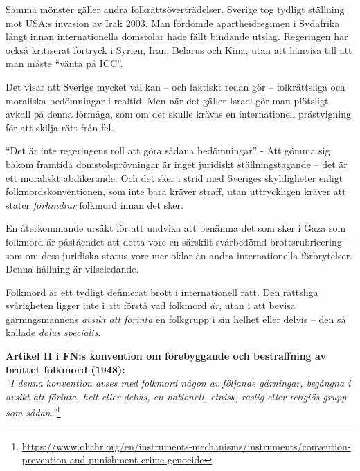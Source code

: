 Samma mönster gäller andra folkrättsöverträdelser. Sverige tog tydligt ställning mot USA:s invasion av Irak 2003. Man fördömde apartheidregimen i Sydafrika långt innan internationella domstolar hade fällt bindande utslag. Regeringen har också kritiserat förtryck i Syrien, Iran, Belarus och Kina, utan att hänvisa till att man måste “vänta på ICC”.

Det visar att Sverige mycket väl kan – och faktiskt redan gör – folkrättsliga och moraliska bedömningar i realtid. Men när det gäller Israel gör man plötsligt avkall på denna förmåga, som om det skulle krävas en internationell prästvigning för att skilja rätt från fel.

``Det är inte regeringens roll att göra sådana bedömningar'' - Att gömma sig bakom framtida domstolsprövningar är inget juridiskt ställningstagande – det är ett moraliskt abdikerande. Och det sker i strid med Sveriges skyldigheter enligt folkmordskonventionen, som inte bara kräver straff, utan uttryckligen kräver att stater \textit{förhindrar} folkmord innan det sker.





En återkommande ursäkt för att undvika att benämna det som sker i Gaza som folkmord är påståendet att detta vore en särskilt svårbedömd brottsrubricering – som om dess juridiska status vore mer oklar än andra internationella förbrytelser. Denna hållning är vilseledande.

Folkmord är ett tydligt definierat brott i internationell rätt. Den rättsliga svårigheten ligger inte i att förstå vad folkmord \textit{är}, utan i att bevisa gärningsmannens \textit{avsikt att förinta} en folkgrupp i sin helhet eller delvis – den så kallade \textit{dolus specialis}.

\textbf{Artikel II i FN:s konvention om förebyggande och bestraffning av brottet folkmord (1948):}\\
\textit{“I denna konvention avses med folkmord någon av följande gärningar, begångna i avsikt att förinta, helt eller delvis, en nationell, etnisk, raslig eller religiös grupp som sådan.”}\footnote{\url{https://www.ohchr.org/en/instruments-mechanisms/instruments/convention-prevention-and-punishment-crime-genocide}}


